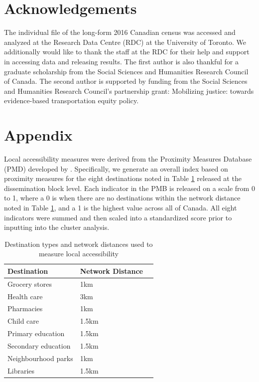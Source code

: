 \documentclass[10 pt,letterpaper]{article}
\renewcommand{\baselinestretch}{1.11}
\begin{document}
\section{Acknowledgements}

The individual file of the long-form 2016 Canadian census was accessed and analyzed at the Research Data Centre (RDC) at the University of Toronto. We additionally would like to thank the staff at the RDC for their help and support in accessing data and releasing results. The first author is also thankful for a graduate scholarship from the Social Sciences and Humanities Research Council of Canada. The second author is supported by funding from the Social Sciences and Humanities Research Council’s partnership grant: Mobilizing justice: towards evidence-based transportation equity policy.




\section*{Appendix}

Local accessibility measures were derived from the Proximity Measures Database (PMD) developed by . Specifically, we generate an overall index based on proximity measures for the eight destinations noted in Table \ref{table:pmd} released at the dissemination block level. Each indicator in the PMB is released on a scale from 0 to 1, where a 0 is when there are no destinations within the network distance noted in Table \ref{table:pmd}, and a 1 is the highest value across all of Canada. All eight indicators were summed and then scaled into a standardized score prior to inputting into the cluster analysis.

\begin{table}[h]
	\small
	\centering
	\caption{{Destination types and network distances used to measure local accessibility}}
	\label{table:pmd}
	\begin{tabular}{lll}
		\hline
		\textbf{Destination}    & \textbf{Network Distance}   \\ \hline
		Grocery stores & 1km \\
		Health care & 3km \\
		Pharmacies & 1km \\
		Child care & 1.5km \\
		Primary education & 1.5km \\
		Secondary education & 1.5km \\
		Neighbourhood parks & 1km \\
		Libraries & 1.5km \\ 
		\hline
	\end{tabular}
\end{table}
	

\renewcommand{\baselinestretch}{1.1} 



\end{document}
